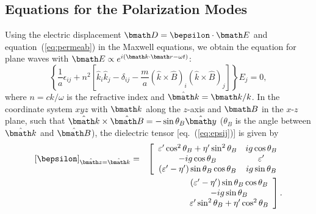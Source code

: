 \documentclass{mn2e}
\newcommand{\be}{\begin{equation}}
\newcommand{\ee}{\end{equation}}
\newcommand{\ba}{\begin{eqnarray}}
\newcommand{\ea}{\end{eqnarray}}
\newcommand{\lp}{\left(}
\newcommand{\rp}{\right)}
\newcommand{\lb}{\left[}
\newcommand{\rb}{\right]}
\newcommand{\vecE}{{\bmath E}}
\newcommand{\vecB}{{\bmath B}}
\newcommand{\vechatB}{\hat{\bmath B}}
\newcommand{\veck}{{\bmath k}}
\newcommand{\vechatk}{\hat{\bmath k}}
\newcommand{\vechaty}{\hat{\bmath y}}
\newcommand{\vechatz}{\hat{\bmath z}}
\newcommand{\vecr}{{\bmath r}}
\newcommand{\thetab}{\theta_B}
\newcommand{\vecD}{{\bmath D}}
\newcommand{\veceps}{{\bepsilon}}
\newcommand{\vpa}{a}
\newcommand{\vpm}{m}
\begin{document}
\subsection{Equations for the Polarization Modes}
\label{sec:modes}

Using the electric displacement $\vecD=\veceps\cdot\vecE$
and equation~(\ref{eq:permeab})
in the Maxwell equations, we obtain the equation for
plane waves with $\vecE\propto e^{i(\veck\cdot\vecr-\omega t)}$:
\be
\left\{ \frac{1}{\vpa}\epsilon_{ij}+n^2\lb\hat{k}_i\hat{k}_j-\delta_{ij}
 - \frac{\vpm}{\vpa}(\hat{k}\times\hat{B})_i(\hat{k}\times\hat{B})_j
 \rb \right\} E_j=0, \label{eq:nrefract}
\ee
where $n=ck/\omega$ is the refractive index and $\vechatk=\veck/k$.
In the coordinate system $xyz$ with $\veck$ along the $z$-axis and
$\vecB$ in the $x$-$z$ plane, such that
$\vechatk\times\vechatB=-\sin\thetab\vechaty$ ($\thetab$ is the
angle between $\vechatk$ and $\vechatB$), the dielectric tensor
[eq.~(\ref{eq:epsij})] is given by
\ba
\lb\veceps\rb_{\vechatz=\vechatk} & = & \lb \begin{array}{cc}
\varepsilon'\cos^2\thetab+\eta'\sin^2\thetab & ig\cos\thetab \\
-ig\cos\thetab & \varepsilon' \\
\lp\varepsilon'-\eta'\rp\sin\thetab\cos\thetab & ig\sin\thetab \\
\end{array} \right. \nonumber \\
 && \qquad \qquad \left. \begin{array}{c}
 \lp\varepsilon'-\eta'\rp\sin\thetab\cos\thetab \\
 -ig\sin\thetab \\
 \varepsilon'\sin^2\thetab+\eta'\cos^2\thetab
\end{array}\rb. \label{eq:epsijx}
\ea
\end{document}
